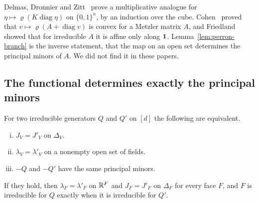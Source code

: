 Delmas, Dronnier and Zitt~\cite[Theorem~2.1]{ddz2024} prove a multiplicative analogue
for $\eta\mapsto\varrho(K\operatorname{diag}\eta)$ on $\{0,1\}^n$, by an induction over the
cube. Cohen~\cite{cohen1981} proved that $v\mapsto\varrho(A+\operatorname{diag}v)$ is convex
for a Metzler matrix $A$, and Friedland~\cite[Theorem~4.1]{friedland1981} showed that for
irreducible $A$ it is affine only along $\mathbf{1}$. Lemma~\ref{lem:perron-branch} is the inverse
statement, that the map on an open set determines the principal minors of $A$. We did not
find it in these papers.

\subsection{The functional determines exactly the principal minors}\label{sec:dv-minors}

\begin{theorem}\label{thm:dv}
For two irreducible generators $Q$ and $Q'$ on $[d]$ the following are equivalent.
\begin{enumerate}[(i)]
\item $J_V=J'_V$ on $\Delta_V$.
\item $\lambda_V=\lambda'_V$ on a nonempty open set of fields.
\item $-Q$ and $-Q'$ have the same principal minors.
\end{enumerate}
If they hold, then $\lambda_F=\lambda'_F$ on $\mathbb{R}^F$ and $J_F=J'_F$ on $\Delta_F$ for every
face $F$, and $F$ is irreducible for $Q$ exactly when it is irreducible for $Q'$.
\end{theorem}

